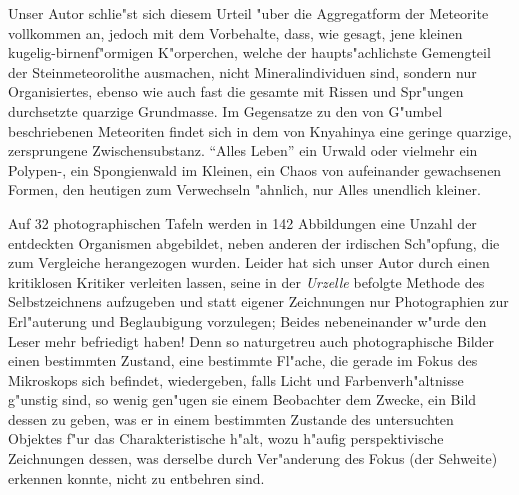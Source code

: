 \documentclass[a4paper, 11pt, oneside]{article}
\begin{document}
Unser Autor schlie"st sich diesem Urteil "uber die Aggregatform der Meteorite vollkommen an, jedoch mit dem Vorbehalte, dass, wie gesagt, jene kleinen kugelig-birnenf"ormigen K"orperchen, welche der haupts"achlichste Gemengteil der Steinmeteorolithe ausmachen, nicht Mineralindividuen sind, sondern nur Organisiertes, ebenso wie auch fast die gesamte mit Rissen und Spr"ungen durchsetzte quarzige Grundmasse. Im Gegensatze zu den von G"umbel beschriebenen Meteoriten findet sich in dem von Knyahinya eine geringe quarzige, zersprungene Zwischensubstanz. "`Alles Leben"' ein Urwald oder vielmehr ein Polypen-, ein Spongienwald im Kleinen, ein Chaos von aufeinander gewachsenen Formen, den heutigen zum Verwechseln "ahnlich, nur Alles unendlich kleiner.

Auf 32 photographischen Tafeln werden in 142 Abbildungen eine Unzahl der entdeckten Organismen abgebildet, neben anderen der irdischen Sch"opfung, die zum Vergleiche herangezogen wurden. Leider hat sich unser Autor durch einen kritiklosen Kritiker verleiten lassen, seine in der \emph{Urzelle} befolgte Methode des Selbstzeichnens aufzugeben und statt eigener Zeichnungen nur Photographien zur Erl"auterung und Beglaubigung vorzulegen; Beides nebeneinander w"urde den Leser mehr befriedigt haben! Denn so naturgetreu auch photographische Bilder einen bestimmten Zustand, eine bestimmte Fl"ache, die gerade im Fokus des Mikroskops sich befindet, wiedergeben, falls Licht und Farbenverh"altnisse g"unstig sind, so wenig gen"ugen sie einem Beobachter dem Zwecke, ein Bild dessen zu geben, was er in einem bestimmten Zustande des untersuchten Objektes f"ur das Charakteristische h"alt, wozu h"aufig perspektivische Zeichnungen dessen, was derselbe durch Ver"anderung des Fokus (der Sehweite) erkennen konnte, nicht zu entbehren sind.
\end{document}

